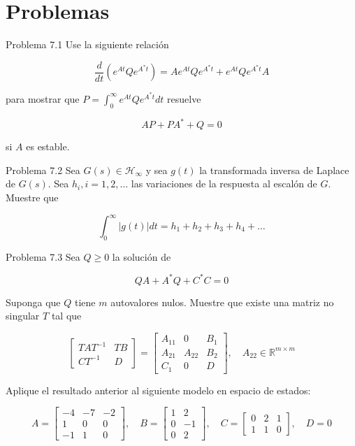 \section{Problemas}
Problema 7.1 Use la siguiente relación

$$
\frac{d}{d t}\left(e^{A t} Q e^{A^{*} t}\right)=A e^{A t} Q e^{A^{*} t}+e^{A t} Q e^{A^{*} t} A
$$

para mostrar que $P=\int_{0}^{\infty} e^{A t} Q e^{A^{*} t} d t$ resuelve

$$
A P+P A^{*}+Q=0
$$

si $A$ es estable.

Problema 7.2 Sea $G(s) \in \mathcal{H}_{\infty}$ y sea $g(t)$ la transformada inversa de Laplace de $G(s)$. Sea $h_{i}, i=1,2, \ldots$ las variaciones de la respuesta al escalón de $G$. Muestre que

$$
\int_{0}^{\infty}|g(t)| d t=h_{1}+h_{2}+h_{3}+h_{4}+\ldots
$$

Problema 7.3 Sea $Q \geq 0$ la solución de

$$
Q A+A^{*} Q+C^{*} C=0
$$

Suponga que $Q$ tiene $m$ autovalores nulos. Muestre que existe una matriz no singular $T$ tal que

$$
\left[\begin{array}{c|c}
T A T^{-1} & T B \\
\hline C T^{-1} & D
\end{array}\right]=\left[\begin{array}{cc|c}
A_{11} & 0 & B_{1} \\
A_{21} & A_{22} & B_{2} \\
\hline C_{1} & 0 & D
\end{array}\right], \quad A_{22} \in \mathbb{R}^{m \times m}
$$

Aplique el resultado anterior al siguiente modelo en espacio de estados:

$$
A=\left[\begin{array}{rrr}
-4 & -7 & -2 \\
1 & 0 & 0 \\
-1 & 1 & 0
\end{array}\right], \quad B=\left[\begin{array}{rr}
1 & 2 \\
0 & -1 \\
0 & 2
\end{array}\right], \quad C=\left[\begin{array}{lll}
0 & 2 & 1 \\
1 & 1 & 0
\end{array}\right], \quad D=0
$$

